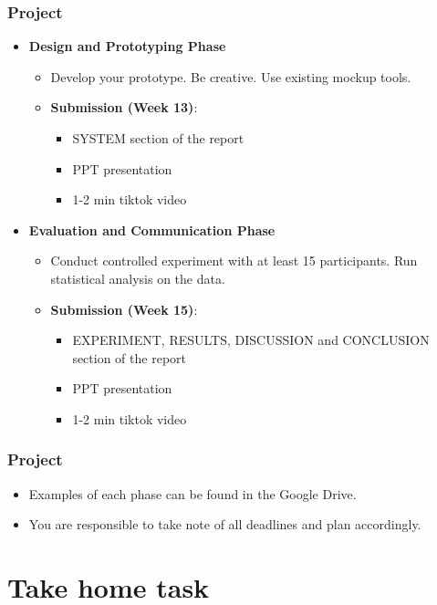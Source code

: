 \documentclass{beamer}
\begin{document}
\begin{frame}
\frametitle{Project}
\footnotesize
\begin{itemize}
	\item \textbf{Design and Prototyping Phase}
	\begin{itemize}
		\item Develop your prototype.   Be creative.  Use existing mockup tools. 
		\item \textbf{Submission (Week 13)}:
		\begin{itemize}
			\item SYSTEM section of the report
			\item  PPT presentation
            \item 1-2 min tiktok video
		\end{itemize}
	\end{itemize}
	\item \textbf{Evaluation and Communication Phase}
	\begin{itemize}
		\item Conduct controlled experiment with at least 15 participants.  Run statistical analysis on the data.  
		\item \textbf{Submission (Week 15)}:
		\begin{itemize}
			\item  EXPERIMENT, RESULTS, DISCUSSION and CONCLUSION section of the report
			\item  PPT presentation
            \item 1-2 min tiktok video
		\end{itemize}
	\end{itemize}
\end{itemize}
\end{frame}

\begin{frame}
\frametitle{Project}
\begin{itemize}
	\item Examples of each phase can be found in the Google Drive.
	\item You are responsible to take note of all deadlines and plan accordingly.
\end{itemize}
\end{frame}

\section{Take home task}
\end{document}
